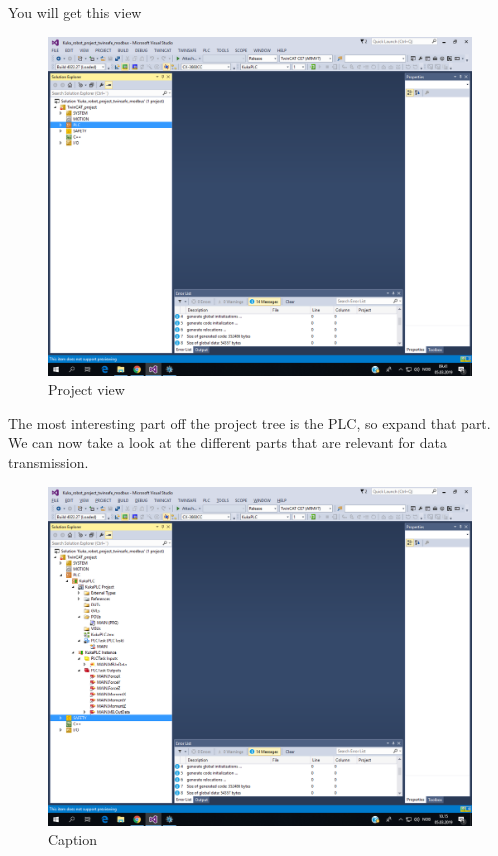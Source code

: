 \documentclass{article}
\begin{document}
\newpage
You will get this view

\begin{figure}[!h]
    \centering
    \includegraphics[width=\textwidth]{pictures/TC3_overview/TC3_project_view.png}
    \caption{Project view}
    
\end{figure}

The most interesting part off the project tree is the PLC, so expand that part. 
\newpage
We can now take a look at the different parts that are relevant for data transmission.

\begin{figure}[!h]
    \centering
    \includegraphics[width=\textwidth]{pictures/TC3_overview/TC3_PLC_expanded.png}
    \caption{Caption}
   
\end{figure}
\end{document}

